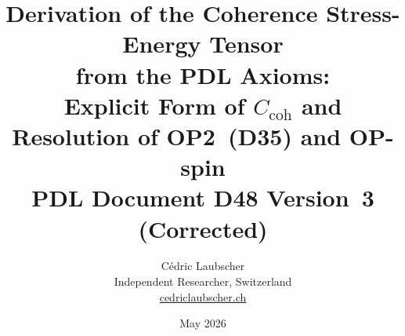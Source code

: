 \documentclass[12pt,a4paper]{article}
\newcommand{\Ccoh}{C_{\mathrm{coh}}}
\begin{document}
\title{\textbf{Derivation of the Coherence Stress-Energy Tensor\\
from the PDL Axioms:\\
Explicit Form of $\Ccoh$ and Resolution of OP2~(D35) and OP-spin}\\[6pt]
{\large PDL Document D48 \textemdash{} Version~3 (Corrected)}}

\author{C\'edric Laubscher\\[4pt]
\small Independent Researcher, Switzerland\\
\small \href{https://cedriclaubscher.ch}{cedriclaubscher.ch}}

\date{May 2026}

\maketitle
\end{document}
